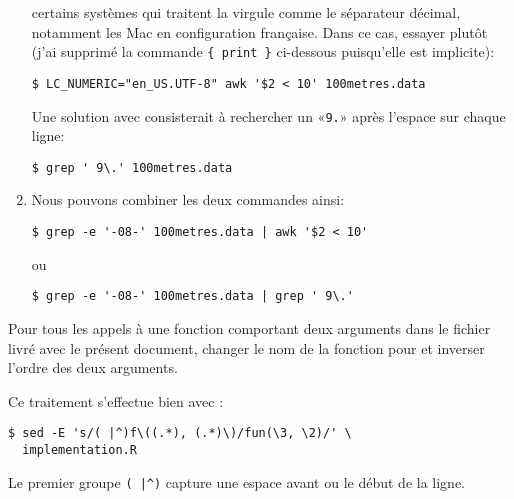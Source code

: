 \begin{exercice}
\begin{sol}
\begin{enumerate}
      certains systèmes qui traitent la virgule comme le séparateur
      décimal, notamment les Mac en configuration française. Dans ce
      cas, essayer plutôt (j'ai supprimé la commande \verb={ print }=
      ci-dessous puisqu'elle est implicite):
      \begin{Schunk}
\begin{Verbatim}
$ LC_NUMERIC="en_US.UTF-8" awk '$2 < 10' 100metres.data
\end{Verbatim}
      \end{Schunk} %
      Une solution avec  consisterait à rechercher un
      «\verb=9.=» après l'espace sur chaque ligne:
      \begin{Schunk}
\begin{Verbatim}
$ grep ' 9\.' 100metres.data
\end{Verbatim}
      \end{Schunk}
    \item Nous pouvons combiner les deux commandes ainsi:
      \begin{Schunk}
\begin{Verbatim}
$ grep -e '-08-' 100metres.data | awk '$2 < 10'
\end{Verbatim}
      \end{Schunk} %
      ou
      \begin{Schunk}
\begin{Verbatim}
$ grep -e '-08-' 100metres.data | grep ' 9\.'
\end{Verbatim}
      \end{Schunk}
    \end{enumerate}
  \end{sol}
\end{exercice}

\begin{exercice}
  Pour tous les appels à une fonction  comportant deux
  arguments dans le fichier  livré avec le
  présent document, changer le nom de la fonction pour  et
  inverser l'ordre des deux arguments.
  \begin{sol}
    Ce traitement s'effectue bien avec :
    \begin{Schunk}
\begin{Verbatim}
$ sed -E 's/( |^)f\((.*), (.*)\)/fun(\3, \2)/' \
  implementation.R
\end{Verbatim}
    \end{Schunk}
    Le premier groupe \verb=( |^)= capture une espace avant 
    ou le début de la ligne.
  \end{sol}
\end{exercice}

